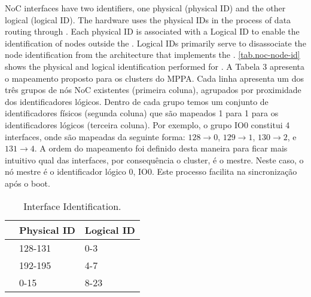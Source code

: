 		NoC interfaces have two identifiers, one physical (physical ID) and the other logical (logical ID).
		The hardware uses the physical IDs in the process of data routing through \noc.
		Each physical ID is associated with a Logical ID to enable the identification
		of \noc nodes outside the \hal.
		Logical IDs primarily serve to disassociate the node identification from the
		architecture that implements the \hal.
			\autoref{tab.noc-node-id} shows the physical and logical identification performed for \mppa.
		A Tabela 3 apresenta o mapeamento proposto para os clusters do MPPA.
		Cada linha apresenta um dos três grupos de nós NoC existentes (primeira coluna), agrupados por proximidade dos identificadores lógicos.
		Dentro de cada grupo temos um conjunto de identificadores físicos (segunda coluna) que são mapeados 1 para 1 para os identificadores lógicos (terceira coluna).
		Por exemplo, o grupo IO0 constitui 4 interfaces, onde são mapeadas da seguinte forma: $128 \to 0$, $129 \to 1$, $130 \to 2$, e $131 \to 4$.
		A ordem do mapeamento foi definido desta maneira para ficar mais intuitivo qual das interfaces, por consequência o cluster, é o mestre.
		Neste caso, o nó mestre é o identificador lógico 0, IO0.
		Este processo facilita na sincronização após o boot.

		\begin{table}[!tb]
			\centering%
			\caption{\noc Interface Identification.}%
			\label{tab.noc-node-id}%

			\begin{tabular}{l|l|l|}
				\cline{2-3}
									                       & \textbf{Physical ID} & \textbf{Logical ID} \\ \hline
				\multicolumn{1}{|l|}{\textbf{\iocluster0}} & 128-131              & 0-3                 \\ \hline
				\multicolumn{1}{|l|}{\textbf{\iocluster1}} & 192-195              & 4-7                 \\ \hline
				\multicolumn{1}{|l|}{\textbf{\ccluster}}   & 0-15                 & 8-23                \\ \hline
			\end{tabular}

		\end{table}

